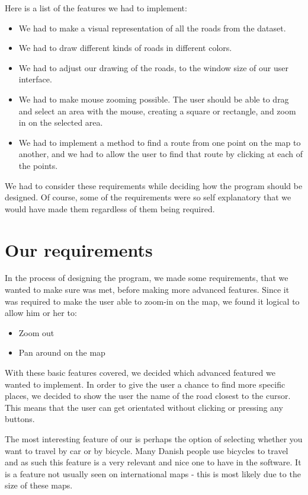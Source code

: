 Here is a list of the features we had to implement: 
\begin{itemize}
  \item We had to make a visual representation of all the roads from the
  dataset.
  \item We had to draw different kinds of roads in different colors.
  \item We had to adjust our drawing of the roads, to the window size of our
  user interface.
  \item We had to make mouse zooming possible.  The user should be able to drag
  and select an area with the mouse, creating a square or rectangle, and zoom in on the
  selected area.
  \item We had to implement a method to find a route from one point on the map to
  another, and we had to allow the user to find that route by clicking at each
  of the points.
\end{itemize}
We had to consider these requirements while
deciding how the program should be designed. Of course, some of the
requirements were so self explanatory that we would have made them regardless
of them being required.

\section{Our requirements}
In the process of designing the program, we made some requirements, that we
wanted to make sure was met, before making more advanced features. Since it was
required to make the user able to zoom-in on the map, we found it logical to
allow him or her to:
\begin{itemize}
  \item Zoom out
  \item Pan around on the map
\end{itemize}

With these basic features covered, we decided which advanced featured we wanted
to implement. In order to give the user a chance to find more specific places, we
decided to show the user the name of the road closest to the cursor. This means
that the user can get orientated without clicking or pressing any buttons. 

The most interesting feature of our  is perhaps the
option of selecting whether you want to travel by car or by bicycle. Many Danish
people use bicycles to travel and as such this feature is a very relevant and
nice one to have in the software. It is a feature not usually seen on
international maps - this is most likely due to the size of these maps.

